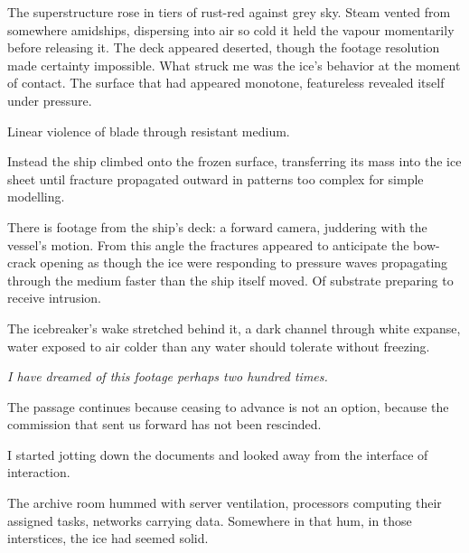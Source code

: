 
The superstructure rose in tiers of rust-red against grey sky. Steam vented from somewhere amidships, dispersing into air so cold it held the vapour momentarily before releasing it. The deck appeared deserted, though the footage resolution made certainty impossible. What struck me was the ice's behavior at the moment of contact. The surface that had appeared monotone, featureless revealed itself under pressure.

Linear violence of blade through resistant medium. 

Instead the ship climbed onto the frozen surface, transferring its mass into the ice sheet until fracture propagated outward in patterns too complex for simple modelling.

There is footage from the ship's deck: a forward camera, juddering with the vessel's motion. From this angle the fractures appeared to anticipate the bow-crack opening as though the ice were responding to pressure waves propagating through the medium faster than the ship itself moved. Of substrate preparing to receive intrusion.

The icebreaker's wake stretched behind it, a dark channel through white expanse, water exposed to air colder than any water should tolerate without freezing.

\textit{I have dreamed of this footage perhaps two hundred times.}

The passage continues because ceasing to advance is not an option, because the commission that sent us forward has not been rescinded.

I started jotting down the documents and looked away from the interface of interaction. 

The archive room hummed with server ventilation, processors computing their assigned tasks, networks carrying data. Somewhere in that hum, in those interstices, the ice had seemed solid.
